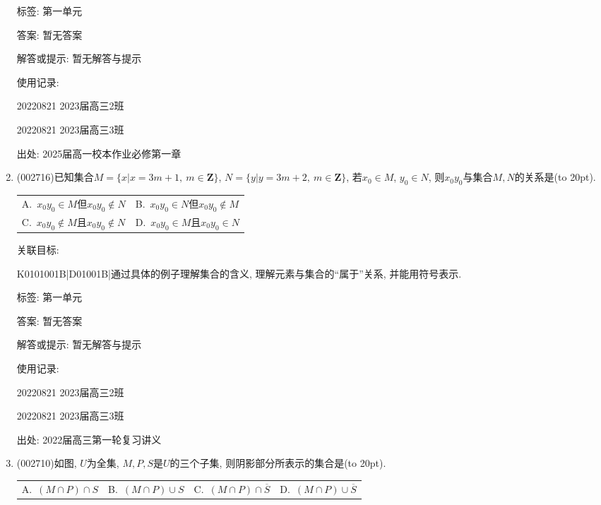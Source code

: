 \documentclass[10pt,a4paper]{article}
\newcommand{\bracket}[1]{(\hbox to #1pt{})}
\newcommand{\twoch}[4]{\par\begin{tabular}{p{.46\textwidth}p{.46\textwidth}}
A.~#1& B.~#2\\
C.~#3& D.~#4
\end{tabular}}
\newcommand{\fourch}[4]{\par\begin{tabular}{p{.23\textwidth}p{.23\textwidth}p{.23\textwidth}p{.23\textwidth}}
A.~#1 &B.~#2& C.~#3& D.~#4
\end{tabular}}
\begin{document}
\begin{enumerate}[1.]
标签: 第一单元

答案: 暂无答案

解答或提示: 暂无解答与提示

使用记录:

20220821	2023届高三2班	

20220821	2023届高三3班	


出处: 2025届高一校本作业必修第一章
\item { (002716)}已知集合$M=\{x|x=3m+1, \ m\in \mathbf{Z}\}$, $N=\{y|y=3m+2, \ m\in \mathbf{Z}\}$, 若$x_0\in M$, $y_0\in N$, 则$x_0y_0$与集合$M,N$的关系是\bracket{20}.
\twoch{$x_0y_0\in M$但$x_0y_0$$\notin N$}{$x_0y_0\in N$但$x_0y_0\notin M$}{$x_0y_0\notin M$且$x_0y_0\notin N$}{$x_0y_0$$\in M$且$x_0y_0\in N$}


关联目标:

K0101001B|D01001B|通过具体的例子理解集合的含义, 理解元素与集合的``属于''关系, 并能用符号表示.



标签: 第一单元

答案: 暂无答案

解答或提示: 暂无解答与提示

使用记录:

20220821	2023届高三2班	

20220821	2023届高三3班	


出处: 2022届高三第一轮复习讲义
\item { (002710)}如图, $U$为全集, $M,P,S$是$U$的三个子集, 则阴影部分所表示的集合是\bracket{20}.
\begin{center}
\end{center}
\fourch{$(M\cap P)\cap S$}{$(M\cap P)\cup S$}{$(M\cap P)\cap \overline S$}{$(M\cap P)\cup \overline S$}



\end{enumerate}
\end{document}
